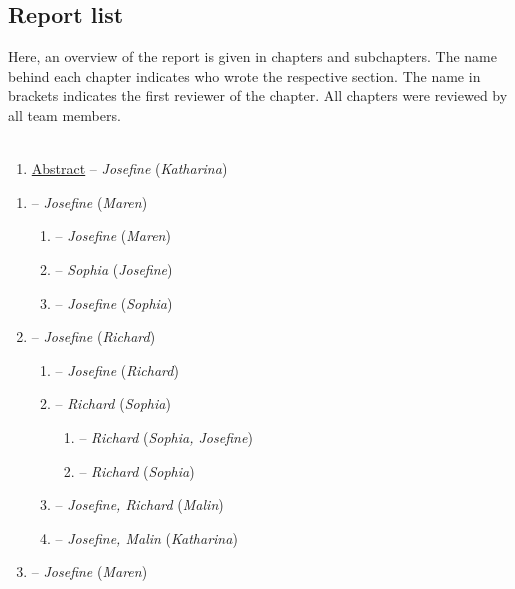 \subsection{Report list}

Here, an overview of the report is given in chapters and subchapters. The name behind each chapter indicates who wrote the respective section. The name in brackets indicates the first reviewer of the chapter. All chapters were reviewed by all team members.
\\
\\
\begin{enumerate}[start=0]
\item \hyperref[Abstract]{Abstract} -- \textit{Josefine} (\textit{Katharina})
\end{enumerate}
\begin{enumerate}
\item {} -- \textit{Josefine} (\textit{Maren})
	\begin{enumerate}[label*=\arabic*.]
	\item {} -- \textit{Josefine} (\textit{Maren})
	\item {} -- \textit{Sophia} (\textit{Josefine})
	\item {} -- \textit{Josefine} (\textit{Sophia})
	\end{enumerate}
\item {} -- \textit{Josefine} (\textit{Richard})
	\begin{enumerate}[label*=\arabic*.]
	\item {} -- \textit{Josefine} (\textit{Richard})
	\item {} -- \textit{Richard} (\textit{Sophia})
		\begin{enumerate}[label*=\arabic*.]
		\item {} -- \textit{Richard} (\textit{Sophia, Josefine})
		\item {} -- \textit{Richard} (\textit{Sophia})
		\end{enumerate}
	\item {} -- \textit{Josefine, Richard} (\textit{Malin})
	\item {} -- \textit{Josefine, Malin} (\textit{Katharina})
	\end{enumerate}
\item {} -- \textit{Josefine} (\textit{Maren})

\end{enumerate}

